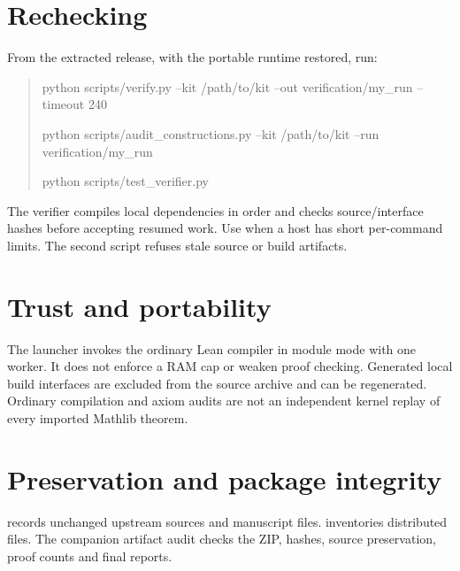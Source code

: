 \documentclass[10pt,letterpaper]{article}
\begin{document}
\section*{Rechecking}
From the extracted release, with the portable runtime restored, run:
\begin{quote}\small\ttfamily
python scripts/verify.py --kit /path/to/kit --out verification/my\_run --timeout 240\par
python scripts/audit\_constructions.py --kit /path/to/kit --run verification/my\_run\par
python scripts/test\_verifier.py
\end{quote}
The verifier compiles local dependencies in order and checks source/interface hashes before accepting resumed work. Use  when a host has short per-command limits. The second script refuses stale source or build artifacts.

\section*{Trust and portability}
The launcher invokes the ordinary Lean compiler in module mode with one worker. It does not enforce a RAM cap or weaken proof checking. Generated local build interfaces are excluded from the source archive and can be regenerated. Ordinary compilation and axiom audits are not an independent kernel replay of every imported Mathlib theorem.

\section*{Preservation and package integrity}
 records unchanged upstream sources and manuscript files.  inventories distributed files. The companion artifact audit checks the ZIP, hashes, source preservation, proof counts and final reports.
\end{document}
